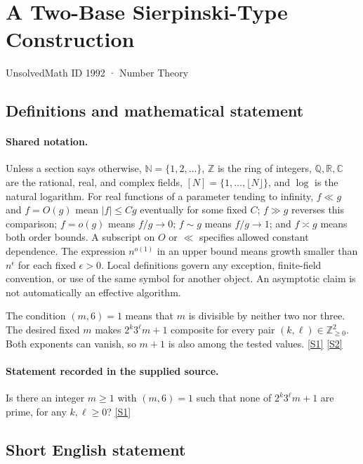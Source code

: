 \documentclass[11pt,a4paper]{article}
\newcommand{\N}{\mathbb{N}}
\newcommand{\Z}{\mathbb{Z}}
\newcommand{\Q}{\mathbb{Q}}
\newcommand{\R}{\mathbb{R}}
\newcommand{\C}{\mathbb{C}}
\newcommand{\sref}[2]{\hyperlink{source:#1:#2}{[S#2]}}
\begin{document}

\setcounter{section}{1991}

\section{A Two-Base Sierpinski-Type Construction}\label{1992}

{\small\sffamily UnsolvedMath ID 1992 · Number Theory}

\subsection{Definitions and mathematical statement}

\paragraph{Shared notation.}Unless a section says otherwise, $\N=\{1,2,\ldots\}$,
$\Z$ is the ring of integers, $\Q,\R,\C$ are the rational, real, and complex
fields, $[N]=\{1,\ldots,\lfloor N\rfloor\}$, and $\log$ is the natural
logarithm. For real functions of a parameter tending to infinity,
$f\ll g$ and $f=O(g)$ mean $|f|\leq Cg$ eventually for some fixed $C$;
$f\gg g$ reverses this comparison; $f=o(g)$ means $f/g\to0$;
$f\sim g$ means $f/g\to1$; and $f\asymp g$ means both order bounds.
A subscript on $O$ or $\ll$ specifies allowed constant dependence.
The expression $n^{o(1)}$ in an upper bound means growth smaller than
$n^\epsilon$ for each fixed $\epsilon>0$. Local definitions govern any
exception, finite-field convention, or use of the same symbol for another
object. An asymptotic claim is not automatically an effective algorithm.



The condition $(m,6)=1$ means that $m$ is divisible by neither two nor three. The desired fixed $m$ makes $2^k3^\ell m+1$ composite for every pair $(k,\ell)\in\Z_{\geq0}^2$. Both exponents can vanish, so $m+1$ is also among the tested values. \sref{1992}{1} \sref{1992}{2}

\paragraph{Statement recorded in the supplied source.}
Is there an integer $m\geq 1$ with $(m,6)=1$ such that none of $2^k3^\ell m+1$ are prime, for any $k,\ell\geq 0$? \sref{1992}{1}

\subsection{Short English statement}
\end{document}
